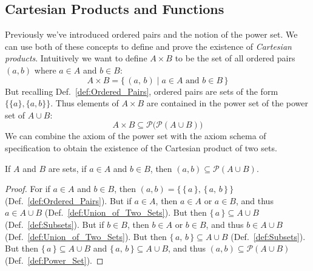     \subsection{Cartesian Products and Functions}
        Previously we've introduced ordered pairs and the notion of the power
        set. We can use both of these concepts to define and prove the existence
        of \textit{Cartesian products}. Intuitively we want to define
        $A\times{B}$ to be the set of all ordered pairs $(a,b)$ where $a\in{A}$
        and $b\in{B}$:
        \begin{equation}
            A\times{B}=\big\{\,(a,\,b)\;|\;a\in{A}\textrm{ and }b\in{B}\,\big\}
        \end{equation}
        But recalling Def.~\ref{def:Ordered_Pairs}, ordered pairs are sets
        of the form $\{\{a\},\{a,b\}\}$. Thus elements of $A\times{B}$ are
        contained in the power set of the power set of $A\cup{B}$:
        \begin{equation}
            A\times{B}\subseteq\mathcal{P}\big(\mathcal{P}(A\cup{B})\big)
        \end{equation}
        We can combine the axiom of the power set with the axiom schema of
        specification to obtain the existence of the Cartesian product of
        two sets.
        \begin{theorem}
            \label{thm:Ordered_Pair_Subset_of_Power_Set}%
            If $A$ and $B$ are sets, if $a\in{A}$ and $b\in{B}$, then
            $(a,b)\subseteq\mathcal{P}(A\cup{B})$.
        \end{theorem}
        \begin{proof}
            For if $a\in{A}$ and $b\in{B}$, then
            $(a,b)=\{\,\{\,a\,\},\,\{\,a,\,b\,\}\,\}$
            (Def.~\ref{def:Ordered_Pairs}). But if $a\in{A}$, then $a\in{A}$
            or $a\in{B}$, and thus $a\in{A}\cup{B}$
            (Def.~\ref{def:Union_of_Two_Sets}). But then
            $\{\,a\,\}\subseteq{A}\cup{B}$ (Def.~\ref{def:Subsets}). But if
            $b\in{B}$, then $b\in{A}$ or $b\in{B}$, and thus $b\in{A}\cup{B}$
            (Def.~\ref{def:Union_of_Two_Sets}). But then
            $\{\,a,\,b\,\}\subseteq{A}\cup{B}$ (Def.~\ref{def:Subsets}).
            But then $\{\,a\,\}\subseteq{A}\cup{B}$ and
            $\{\,a,\,b\,\}\subseteq{A}\cup{B}$, and thus
            $(a,b)\subseteq\mathcal{P}(A\cup{B})$ (Def.~\ref{def:Power_Set}).
        \end{proof}
